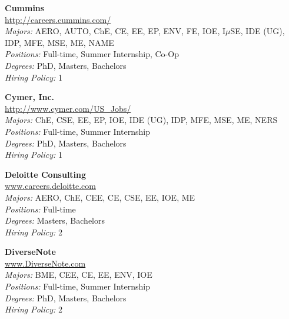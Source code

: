 \documentclass{article}
\begin{document}
\begin{center}
\begin{multicols}{3}
\begin{minipage}{.9\columnwidth}{\Large\bf Cummins }\\
	\url{http://careers.cummins.com/}\\
	\emph{Majors:} AERO, AUTO, ChE, CE, EE, EP, ENV, FE, IOE, I$\mu$SE, IDE (UG), IDP, MFE, MSE, ME, NAME\\
	\emph{Positions:} Full-time, Summer Internship, Co-Op\\
	\emph{Degrees:} PhD, Masters, Bachelors\\
	\emph{Hiring Policy:} 1\\
\end{minipage}
 
\begin{minipage}{.9\columnwidth}{\Large\bf Cymer, Inc. }\\
	\url{http://www.cymer.com/US_Jobs/}\\
	\emph{Majors:} ChE, CSE, EE, EP, IOE, IDE (UG), IDP, MFE, MSE, ME, NERS\\
	\emph{Positions:} Full-time, Summer Internship\\
	\emph{Degrees:} PhD, Masters, Bachelors\\
	\emph{Hiring Policy:} 1\\
\end{minipage}
 
\begin{minipage}{.9\columnwidth}{\Large\bf Deloitte Consulting }\\
	\url{www.careers.deloitte.com}\\
	\emph{Majors:} AERO, ChE, CEE, CE, CSE, EE, IOE, ME\\
	\emph{Positions:} Full-time\\
	\emph{Degrees:} Masters, Bachelors\\
	\emph{Hiring Policy:} 2\\
\end{minipage}
 
\begin{minipage}{.9\columnwidth}{\Large\bf DiverseNote }\\
	\url{www.DiverseNote.com}\\
	\emph{Majors:} BME, CEE, CE, EE, ENV, IOE\\
	\emph{Positions:} Full-time, Summer Internship\\
	\emph{Degrees:} PhD, Masters, Bachelors\\
	\emph{Hiring Policy:} 2\\
\end{minipage}
 

\end{multicols}
\end{center}
\end{document}
